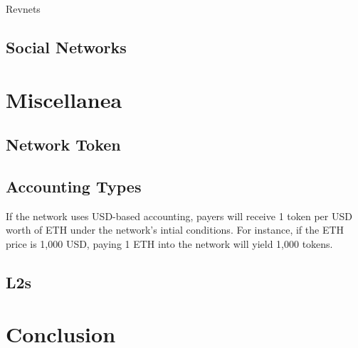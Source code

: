 \documentclass{article}
\begin{document}
Revnets 

\subsection{Social Networks}

\section{Miscellanea}

\subsection{Network Token}

\subsection{Accounting Types}\label{sec:accounting_types}

If the network uses USD-based accounting, payers will receive 1 token per USD worth of ETH under the network's intial conditions. For instance, if the ETH price is 1,000 USD, paying 1 ETH into the network will yield 1,000 tokens.

\subsection{L2s}

\section{Conclusion}

% 
% 
\end{document}
